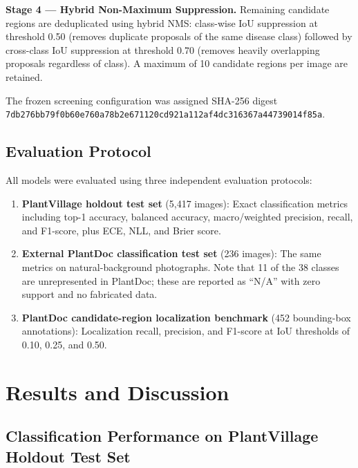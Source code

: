 \documentclass[pdflatex,sn-mathphys-num]{sn-jnl}
\theoremstyle{thmstyleone}%
\theoremstyle{thmstyletwo}%
\theoremstyle{thmstylethree}%
\begin{document}
\textbf{Stage 4 — Hybrid Non-Maximum Suppression.}
Remaining candidate regions are deduplicated using hybrid NMS: class-wise IoU
suppression at threshold 0.50 (removes duplicate proposals of the same disease class)
followed by cross-class IoU suppression at threshold 0.70 (removes heavily overlapping
proposals regardless of class). A maximum of 10 candidate regions per image are retained.

The frozen screening configuration was assigned SHA-256 digest
\texttt{7db276bb79f0b60e760a78b2e671120cd921a112af4dc316367a44739014f85a}.

\subsection{Evaluation Protocol}
\label{sec:eval_protocol}

All models were evaluated using three independent evaluation protocols:

\begin{enumerate}
  \item \textbf{PlantVillage holdout test set} (5{,}417 images): Exact classification
        metrics including top-1 accuracy, balanced accuracy, macro/weighted precision,
        recall, and F1-score, plus ECE, NLL, and Brier score.
  \item \textbf{External PlantDoc classification test set} (236 images): The same
        metrics on natural-background photographs. Note that 11 of the 38 classes are
        unrepresented in PlantDoc; these are reported as ``N/A'' with zero support and
        no fabricated data.
  \item \textbf{PlantDoc candidate-region localization benchmark} (452 bounding-box
        annotations): Localization recall, precision, and F1-score at IoU thresholds
        of 0.10, 0.25, and 0.50.
\end{enumerate}


\section{Results and Discussion}
\label{sec:results}

\subsection{Classification Performance on PlantVillage Holdout Test Set}
\label{sec:results_plantvillage}
\end{document}
